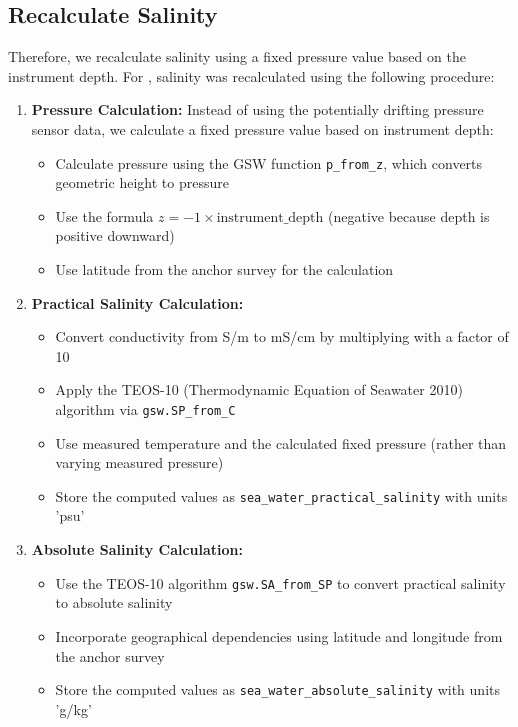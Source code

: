 \subsection{Recalculate Salinity}
Therefore, we recalculate salinity using a fixed pressure value based on the instrument depth.
For \projectname{} \casenumber{}, salinity was recalculated using the following procedure:

\begin{enumerate}
    \item \textbf{Pressure Calculation:} Instead of using the potentially drifting pressure sensor data, we calculate a fixed pressure value based on instrument depth:
    \begin{itemize}
        \item Calculate pressure using the GSW function \texttt{p\_from\_z}, which converts geometric height to pressure
        \item Use the formula $z = -1 \times \text{instrument\_depth}$ (negative because depth is positive downward)
        \item Use latitude from the anchor survey for the calculation
    \end{itemize}
    
    \item \textbf{Practical Salinity Calculation:}
    \begin{itemize}
        \item Convert conductivity from S/m to mS/cm by multiplying with a factor of 10
        \item Apply the TEOS-10 (Thermodynamic Equation of Seawater 2010) algorithm via \texttt{gsw.SP\_from\_C}
        \item Use measured temperature and the calculated fixed pressure (rather than varying measured pressure)
        \item Store the computed values as \texttt{sea\_water\_practical\_salinity} with units 'psu'
    \end{itemize}
    
    \item \textbf{Absolute Salinity Calculation:}
    \begin{itemize}
        \item Use the TEOS-10 algorithm \texttt{gsw.SA\_from\_SP} to convert practical salinity to absolute salinity
        \item Incorporate geographical dependencies using latitude and longitude from the anchor survey
        \item Store the computed values as \texttt{sea\_water\_absolute\_salinity} with units 'g/kg'
    \end{itemize}
    

\end{enumerate}
